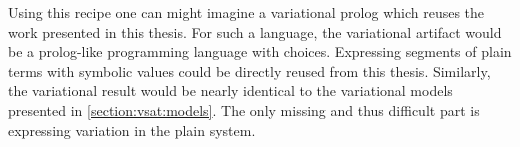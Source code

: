Using this recipe one can might imagine a variational prolog which reuses the
work presented in this thesis. For such a language, the variational artifact
would be a prolog-like programming language with choices. Expressing segments of
plain terms with symbolic values could be directly reused from this thesis.
Similarly, the variational result would be nearly identical to the variational
models presented in \autoref{section:vsat:models}. The only missing and thus
difficult part is expressing variation in the plain system.

